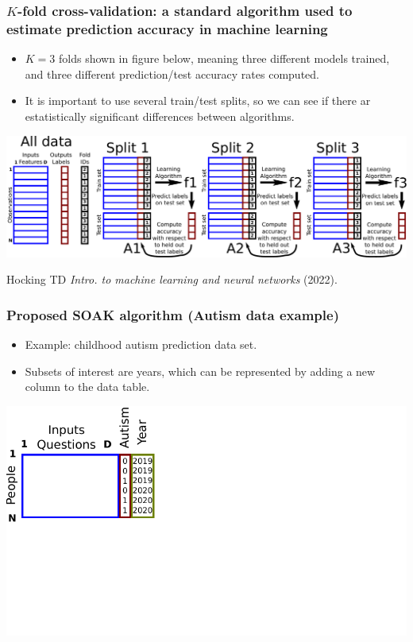 \documentclass[t]{beamer}
\begin{document}
\begin{frame}
  \frametitle{$K$-fold cross-validation: a standard algorithm used to estimate prediction accuracy in machine learning}

  \begin{itemize}
  \item $K=3$ folds shown in figure below, meaning three different
    models trained, and three different prediction/test accuracy rates
    computed.
  \item It is important to use several train/test splits, so we can
    see if there ar estatistically significant differences between
    algorithms.
  \end{itemize}

  \includegraphics[width=\textwidth]{drawing-cross-validation.pdf}

  \small Hocking TD \emph{Intro. to machine learning and neural
    networks} (2022).
\end{frame}


\begin{frame}
  \frametitle{Proposed SOAK algorithm (Autism data example)}
  \begin{itemize}
  \item Example: childhood autism prediction data set.
  \item Subsets of interest are years, which can be represented by
    adding a new column to the data table.
  \end{itemize}
  \includegraphics[width=\textwidth]{drawing-cv-same-other-years-1.pdf}
\end{frame}
\end{document}
